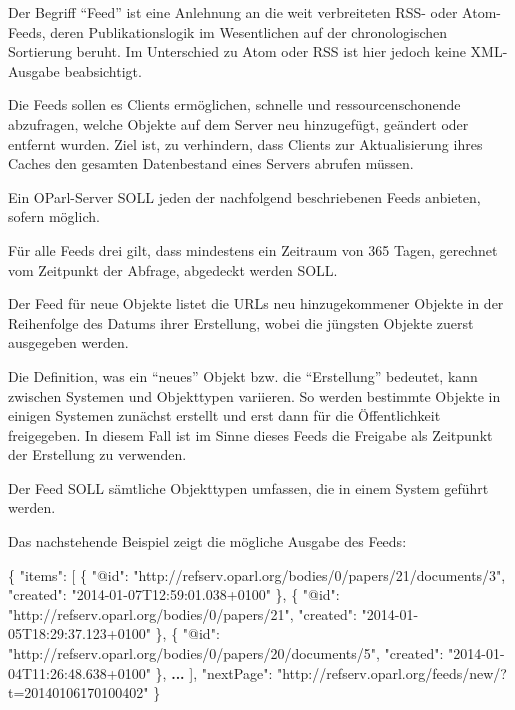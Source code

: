 \documentclass[,a4paper]{article}
\newenvironment{Shaded}{}{}
\newcommand{\DataTypeTok}[1]{\textcolor[rgb]{0.56,0.13,0.00}{{#1}}}
\newcommand{\StringTok}[1]{\textcolor[rgb]{0.25,0.44,0.63}{{#1}}}
\newcommand{\ErrorTok}[1]{\textcolor[rgb]{1.00,0.00,0.00}{\textbf{{#1}}}}
\newcommand{\NormalTok}[1]{{#1}}
\begin{document}
Der Begriff ``Feed'' ist eine Anlehnung an die weit verbreiteten RSS-
oder Atom-Feeds, deren Publikationslogik im Wesentlichen auf der
chronologischen Sortierung beruht. Im Unterschied zu Atom oder RSS ist
hier jedoch keine XML-Ausgabe beabsichtigt.

Die Feeds sollen es Clients ermöglichen, schnelle und
ressourcenschonende abzufragen, welche Objekte auf dem Server neu
hinzugefügt, geändert oder entfernt wurden. Ziel ist, zu verhindern,
dass Clients zur Aktualisierung ihres Caches den gesamten Datenbestand
eines Servers abrufen müssen.

Ein OParl-Server SOLL jeden der nachfolgend beschriebenen Feeds
anbieten, sofern möglich.

Für alle Feeds drei gilt, dass mindestens ein Zeitraum von 365 Tagen,
gerechnet vom Zeitpunkt der Abfrage, abgedeckt werden SOLL.


Der Feed für neue Objekte listet die URLs neu hinzugekommener Objekte in
der Reihenfolge des Datums ihrer Erstellung, wobei die jüngsten Objekte
zuerst ausgegeben werden.

Die Definition, was ein ``neues'' Objekt bzw. die ``Erstellung''
bedeutet, kann zwischen Systemen und Objekttypen variieren. So werden
bestimmte Objekte in einigen Systemen zunächst erstellt und erst dann
für die Öffentlichkeit freigegeben. In diesem Fall ist im Sinne dieses
Feeds die Freigabe als Zeitpunkt der Erstellung zu verwenden.

Der Feed SOLL sämtliche Objekttypen umfassen, die in einem System
geführt werden.

Das nachstehende Beispiel zeigt die mögliche Ausgabe des Feeds:

\begin{Shaded}
\begin{Highlighting}[]
\NormalTok{\{}
    \DataTypeTok{"items"}\NormalTok{: [}
        \NormalTok{\{}
            \DataTypeTok{"@id"}\NormalTok{: }\StringTok{"http://refserv.oparl.org/bodies/0/papers/21/documents/3"}\NormalTok{,}
            \DataTypeTok{"created"}\NormalTok{: }\StringTok{"2014-01-07T12:59:01.038+0100"}
        \NormalTok{\},}
        \NormalTok{\{}
            \DataTypeTok{"@id"}\NormalTok{: }\StringTok{"http://refserv.oparl.org/bodies/0/papers/21"}\NormalTok{,}
            \DataTypeTok{"created"}\NormalTok{: }\StringTok{"2014-01-05T18:29:37.123+0100"}
        \NormalTok{\},}
        \NormalTok{\{}
            \DataTypeTok{"@id"}\NormalTok{: }\StringTok{"http://refserv.oparl.org/bodies/0/papers/20/documents/5"}\NormalTok{,}
            \DataTypeTok{"created"}\NormalTok{: }\StringTok{"2014-01-04T11:26:48.638+0100"}
        \NormalTok{\},}
        \ErrorTok{...}
    \NormalTok{],}
    \DataTypeTok{"nextPage"}\NormalTok{: }\StringTok{"http://refserv.oparl.org/feeds/new/?t=20140106170100402"}
\NormalTok{\}}
\end{Highlighting}
\end{Shaded}
\end{document}
